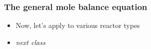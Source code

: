 \begin{frame}\frametitle{The general mole balance equation}
	\begin{itemize}
		\item	Now, let's apply to various reactor types 
		\item	\emph{next class}
	\end{itemize}
\end{frame}

\begin{comment}

\section{Batch}
\begin{frame}\frametitle{1.3 Batch reactors}
	\begin{itemize}
		\item	No inflow or outflow.
		\item	Charge reactors with reactants then close up.

		\item	Typically perfectly mixed, so $\int_V r_j(V)dV$ can be replaced by $r_jV$
	\end{itemize}
\end{frame}

\begin{frame}
	\begin{itemize}
		\item	<1->{ The mole balance reduces to $$\frac{dN_j}{dt} = r_jV$$ }
		\item	<1->{\textbf{Note:} $V$ is \emph{not} assumed to be constant here. It could be a function of time or of the extent of reaction (and indirectly a function of time).}
	\end{itemize}
\end{frame}

\begin{frame}\frametitle{Problem 1.1}
	\begin{itemize}
		\item	<1->{$$A\longrightarrow2B, -r_A = kC_A, k = 0.23\text{min}^{-1}$$ in a const volume batch reactor. $C_{A0} = 2$mol/L, $V=10$L. How long does it take to reduce the conc of $A$ in reactor to 0.2 mol/L? }
		\item	<1->{\textcolor{blue}{Solution: {\bf First solve analytically}} $$\frac{dN_A}{dt} = r_AV = -kC_AV$$ }
	\end{itemize}
\end{frame}


\end{comment}
